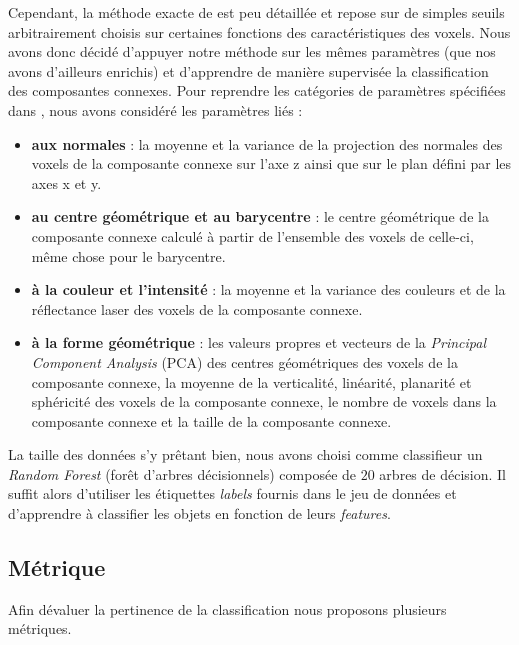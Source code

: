 \documentclass[a4paper, onecolumn, 11pt]{article}
\begin{document}
Cependant, la méthode exacte de \cite{aka_article} est peu détaillée et repose sur de simples seuils arbitrairement choisis sur certaines fonctions des caractéristiques des voxels. Nous avons donc décidé d'appuyer notre méthode sur les mêmes paramètres (que nos avons d'ailleurs enrichis) et d'apprendre de manière supervisée la classification des composantes connexes. Pour reprendre les catégories de paramètres spécifiées dans \cite{aka_article}, nous avons considéré les paramètres liés :
\begin{itemize}
\item \textbf{aux normales} : la moyenne et la variance de la projection des normales des voxels de la composante connexe sur l'axe z ainsi que sur le plan défini par les axes x et y.
\item \textbf{au centre géométrique et au barycentre} : le centre géométrique de la composante connexe calculé à partir de l'ensemble des voxels de celle-ci, même chose pour le barycentre.
\item \textbf{à la couleur et l'intensité} : la moyenne et la variance des couleurs et de la réflectance laser des voxels de la composante connexe.
\item \textbf{à la forme géométrique} : les valeurs propres et vecteurs de la \emph{Principal Component Analysis} (PCA) des centres géométriques des voxels de la composante connexe, la moyenne de la verticalité, linéarité, planarité et sphéricité  des voxels de la composante connexe, le nombre de voxels dans la composante connexe et la taille de la composante connexe.
\end{itemize}
La taille des données s'y prêtant bien, nous avons choisi comme classifieur un \emph{Random Forest} (forêt d'arbres décisionnels) composée de $20$ arbres de décision. Il suffit alors d'utiliser les étiquettes \emph{labels} fournis dans le jeu de données et d'apprendre à classifier les objets en fonction de leurs \emph{features}.

\subsection{Métrique}

Afin dévaluer la pertinence de la classification nous proposons plusieurs métriques.
\end{document}
